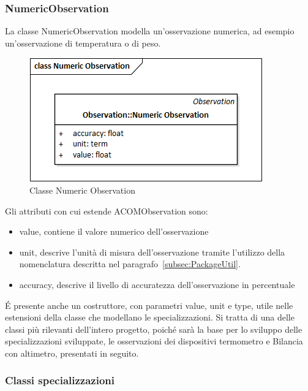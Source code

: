 \documentclass[a4paper]{article}
\begin{document}
\subsubsection{NumericObservation}
La classe NumericObservation modella un'osservazione numerica, ad esempio un'osservazione di temperatura o di peso. 
\begin{figure}[H]
    \centering
    \includegraphics[width=1\linewidth]{figures/image.png}
    \caption{Classe Numeric Observation}
    \label{fig:numeric-observation}
\end{figure}
Gli attributi con cui estende ACOMObservation sono:
\begin{itemize}
    \item value, contiene il valore numerico dell'osservazione
    \item unit, descrive l'unità di misura dell'osservazione tramite l'utilizzo della nomenclatura descritta nel paragrafo~\ref{subsec:PackageUtil}.
    \item accuracy, descrive il livello di accuratezza dell'osservazione in percentuale
\end{itemize}
\'E presente anche un costruttore, con parametri value, unit e type, utile nelle estensioni della classe che modellano le specializzazioni.
Si tratta di una delle classi più rilevanti dell'intero progetto, poiché sarà la base per lo sviluppo delle specializzazioni sviluppate, le osservazioni dei dispositivi termometro e Bilancia con altimetro, presentati in seguito.
\subsubsection{Classi specializzazioni}
\end{document}
